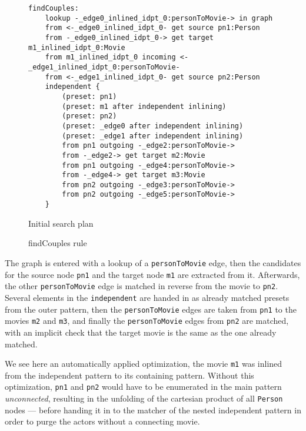\begin{figure}[hp]
	\begin{verbatim}
findCouples:
    lookup -_edge0_inlined_idpt_0:personToMovie-> in graph
    from <-_edge0_inlined_idpt_0- get source pn1:Person
    from -_edge0_inlined_idpt_0-> get target m1_inlined_idpt_0:Movie
    from m1_inlined_idpt_0 incoming <-_edge1_inlined_idpt_0:personToMovie-
    from <-_edge1_inlined_idpt_0- get source pn2:Person
    independent {
        (preset: pn1)
        (preset: m1 after independent inlining)
        (preset: pn2)
        (preset: _edge0 after independent inlining)
        (preset: _edge1 after independent inlining)
        from pn1 outgoing -_edge2:personToMovie->
        from -_edge2-> get target m2:Movie
        from pn1 outgoing -_edge4:personToMovie->
        from -_edge4-> get target m3:Movie
        from pn2 outgoing -_edge3:personToMovie->
        from pn2 outgoing -_edge5:personToMovie->
    }
\end{verbatim}
	\caption{Initial search plan}
	\label{fig:InitialSP}
\end{figure}

\begin{figure}[hp]
	
	\caption{findCouples rule}
	\label{fig:findCouples.grg}
\end{figure}

The graph is entered with a lookup of a \texttt{personToMovie} edge, then the candidates for the source node \texttt{pn1} and the target node \texttt{m1} are extracted from it.
Afterwards, the other \texttt{personToMovie} edge is matched in reverse from the movie to \texttt{pn2}.
Several elements in the \texttt{independent} are handed in as already matched presets from the outer pattern, 
then the \texttt{personToMovie} edges are taken from \texttt{pn1} to the movies \texttt{m2} and \texttt{m3}, 
and finally the \texttt{personToMovie} edges from \texttt{pn2} are matched, with an implicit check that the target movie is the same as the one already matched.

We see here an automatically applied optimization, the movie \texttt{m1} was inlined from the independent pattern to its containing pattern.
Without this optimization, \texttt{pn1} and \texttt{pn2} would have to be enumerated in the main pattern \emph{unconnected}, resulting in the unfolding of the cartesian product of all \texttt{Person} nodes 
--- before handing it in to the matcher of the nested independent pattern in order to purge the actors without a connecting movie.

